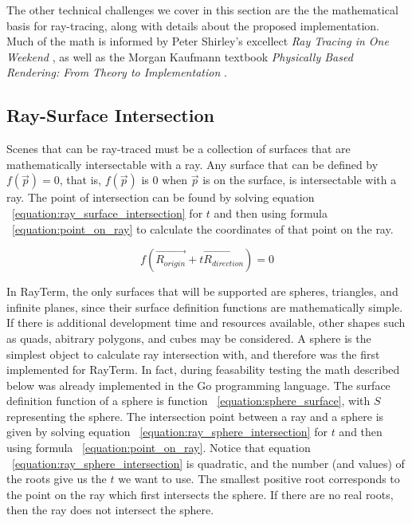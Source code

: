 \documentclass[11pt]{article}
\newcommand{\name}{{\sc RayTerm}}
\newcommand{\rayorg}{\vec{R_{origin}}}
\newcommand{\raydir}{\vec{R_{direction}}}
\begin{document}
The other technical challenges we cover in this section are the the mathematical basis for ray-tracing, along with details about the proposed implementation.
Much of the math is informed by Peter Shirley's excellect {\it Ray Tracing in One Weekend} \cite{shirley2016ray}, as well as the Morgan Kaufmann textbook {\it Physically Based Rendering: From Theory to Implementation} \cite{pharr2016physically}.


\subsection{Ray-Surface Intersection}

Scenes that can be ray-traced must be a collection of surfaces that are mathematically intersectable with a ray.
Any surface that can be defined by $f(\vec{p}) = 0$, that is, $f(\vec{p})$ is $0$ when $\vec{p}$ is on the surface, is intersectable with a ray.
The point of intersection can be found by solving equation ~\ref{equation:ray_surface_intersection} for $t$ and then using formula ~\ref{equation:point_on_ray} to calculate the coordinates of that point on the ray.

\begin{equation}
  \label{equation:ray_surface_intersection}
  f(\rayorg + t\raydir) = 0
\end{equation}

In \name, the only surfaces that will be supported are spheres, triangles, and infinite planes, since their surface definition functions are mathematically simple.
If there is additional development time and resources available, other shapes such as quads, abitrary polygons, and cubes may be considered.
A sphere is the simplest object to calculate ray intersection with, and therefore was the first implemented for \name.
In fact, during feasability testing the math described below was already implemented in the Go programming language.
The surface definition function of a sphere is function ~\ref{equation:sphere_surface}, with $S$ representing the sphere.
The intersection point between a ray and a sphere is given by solving equation ~\ref{equation:ray_sphere_intersection} for $t$ and then using formula ~\ref{equation:point_on_ray}.
Notice that equation ~\ref{equation:ray_sphere_intersection} is quadratic, and the number (and values) of the roots give us the $t$ we want to use.
The smallest positive root corresponds to the point on the ray which first intersects the sphere.
If there are no real roots, then the ray does not intersect the sphere.
\end{document}
